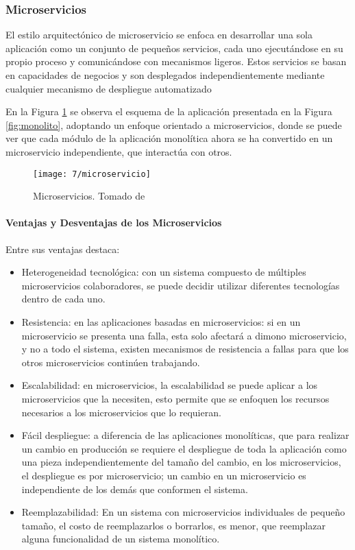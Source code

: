 \subsubsection{Microservicios}

El estilo arquitectónico de microservicio \cite{Richardson2016} \cite{Erl2007} se enfoca en desarrollar una sola aplicación como un conjunto de pequeños servicios, cada uno ejecutándose en su propio proceso y comunicándose con mecanismos ligeros. Estos servicios se basan en capacidades de negocios y son desplegados independientemente mediante cualquier mecanismo de despliegue automatizado

En la Figura \ref{fig:microservicio} se observa el esquema de la aplicación presentada en la Figura \ref{fig:monolito}, adoptando  un enfoque orientado a microservicios, donde se puede ver que cada módulo de la aplicación monolítica ahora se ha convertido en un microservicio independiente, que interactúa con otros.

 \begin{figure}%
 		\centering
	\texttt{[image: 7/microservicio]} 
	\caption{Microservicios. Tomado de \cite{Salas2017} }
	\label{fig:microservicio}
\end{figure}

\paragraph{Ventajas y Desventajas de los Microservicios}
Entre sus ventajas destaca:
\begin{itemize}
	\item Heterogeneidad tecnológica: con un sistema compuesto de múltiples microservicios colaboradores, se puede decidir utilizar diferentes tecnologías dentro de cada uno.
	\item Resistencia: en las aplicaciones basadas en microservicios: si en un microservicio se presenta una falla, esta solo afectará a dimono microservicio, y no a todo el sistema, existen mecanismos de resistencia a fallas para que los otros microservicios continúen trabajando.
	\item Escalabilidad: en microservicios, la escalabilidad se puede aplicar a los microservicios que la necesiten, esto permite que se enfoquen los recursos necesarios a los microservicios que lo requieran.
	\item Fácil despliegue: a diferencia de las aplicaciones monolíticas, que para realizar un cambio en producción se requiere el despliegue de toda la aplicación como una pieza independientemente del tamaño del cambio, en los microservicios, el despliegue es por microservicio; un cambio en un microservicio es independiente de los demás que conformen el sistema.
	\item Reemplazabilidad: En un sistema con microservicios individuales de pequeño tamaño, el costo de reemplazarlos o borrarlos, es menor, que reemplazar alguna funcionalidad de un sistema monolítico.
\end{itemize}

